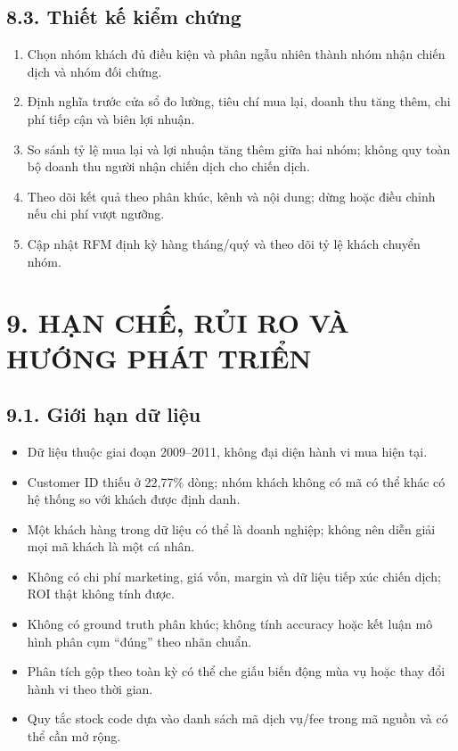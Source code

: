 \documentclass[a4paper]{article}
\begin{document}
\subsection*{8.3. Thiết kế kiểm chứng}

\begin{enumerate}
\item Chọn nhóm khách đủ điều kiện và phân ngẫu nhiên thành nhóm nhận chiến dịch và nhóm đối chứng.
\item Định nghĩa trước cửa sổ đo lường, tiêu chí mua lại, doanh thu tăng thêm, chi phí tiếp cận và biên lợi nhuận.
\item So sánh tỷ lệ mua lại và lợi nhuận tăng thêm giữa hai nhóm; không quy toàn bộ doanh thu người nhận chiến dịch cho chiến dịch.
\item Theo dõi kết quả theo phân khúc, kênh và nội dung; dừng hoặc điều chỉnh nếu chi phí vượt ngưỡng.
\item Cập nhật RFM định kỳ hàng tháng/quý và theo dõi tỷ lệ khách chuyển nhóm.
\end{enumerate}


\section*{9. HẠN CHẾ, RỦI RO VÀ HƯỚNG PHÁT TRIỂN}

\subsection*{9.1. Giới hạn dữ liệu}

\begin{itemize}
\item Dữ liệu thuộc giai đoạn 2009--2011, không đại diện hành vi mua hiện tại.
\item Customer ID thiếu ở 22,77\% dòng; nhóm khách không có mã có thể khác có hệ thống so với khách được định danh.
\item Một khách hàng trong dữ liệu có thể là doanh nghiệp; không nên diễn giải mọi mã khách là một cá nhân.
\item Không có chi phí marketing, giá vốn, margin và dữ liệu tiếp xúc chiến dịch; ROI thật không tính được.
\item Không có ground truth phân khúc; không tính accuracy hoặc kết luận mô hình phân cụm “đúng” theo nhãn chuẩn.
\item Phân tích gộp theo toàn kỳ có thể che giấu biến động mùa vụ hoặc thay đổi hành vi theo thời gian.
\item Quy tắc stock code dựa vào danh sách mã dịch vụ/fee trong mã nguồn và có thể cần mở rộng.
\end{itemize}
\end{document}
